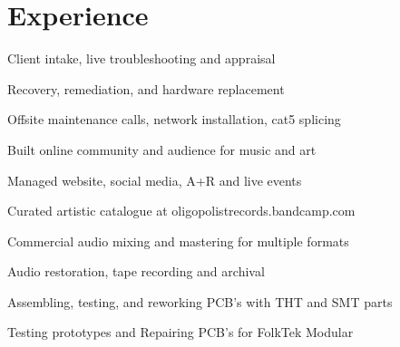 \documentclass[]{quinnJarvisHollandLatex}
\begin{document}
%
%
%
%
\begin{minipage}[t]{0.60\textwidth}
\section{Experience}
\vspace{\topsep} %
\begin{tightemize}
\item Client intake, live troubleshooting and appraisal
\item Recovery, remediation, and hardware replacement
\item Offsite maintenance calls, network installation, cat5 splicing
\end{tightemize}


\begin{tightemize}
\item{Built online community and audience for music and art}
\item{Managed website, social media, A+R and live events}
\item{Curated artistic catalogue at oligopolistrecords.bandcamp.com}
\end{tightemize}

\begin{tightemize}
\item Commercial audio mixing and mastering for multiple formats
\item Audio restoration, tape recording and archival
\item Assembling, testing, and reworking PCB's with THT and SMT parts
\item Testing prototypes and Repairing PCB's for FolkTek Modular
\end{tightemize}


\end{minipage}
\end{document}

